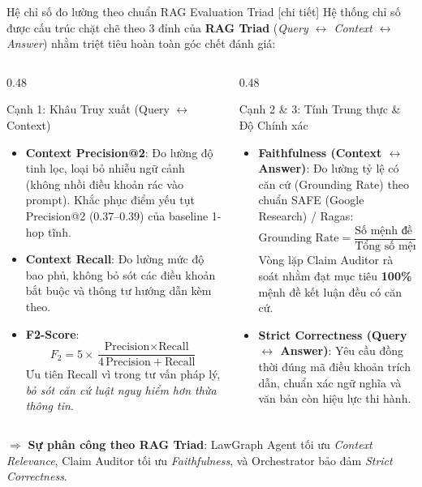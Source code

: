 \documentclass[aspectratio=169,10pt]{beamer}
\begin{document}
\begin{frame}{Hệ chỉ số đo lường theo chuẩn RAG Evaluation Triad [chi tiết]}
{\footnotesize Hệ thống chỉ số được cấu trúc chặt chẽ theo 3 đỉnh của \textbf{RAG Triad} (\textit{Query $\leftrightarrow$ Context $\leftrightarrow$ Answer}) nhằm triệt tiêu hoàn toàn góc chết đánh giá:}
\vskip0.15cm
\begin{columns}[T]
\begin{column}{0.48\textwidth}
\begin{block}{\small Cạnh 1: Khâu Truy xuất (Query $\leftrightarrow$ Context)}
\footnotesize
\begin{itemize}
  \item \textbf{Context Precision@2}: Đo lường độ tinh lọc, loại bỏ nhiễu ngữ cảnh (không nhồi điều khoản rác vào prompt). Khắc phục điểm yếu tụt Precision@2 (0.37--0.39) của baseline 1-hop tĩnh.
  \item \textbf{Context Recall}: Đo lường mức độ bao phủ, không bỏ sót các điều khoản bắt buộc và thông tư hướng dẫn kèm theo.
  \item \textbf{F2-Score}:
    $$F_2 = 5 \times \frac{\text{Precision} \times \text{Recall}}{4\,\text{Precision} + \text{Recall}}$$
    Ưu tiên Recall vì trong tư vấn pháp lý, \textit{bỏ sót căn cứ luật nguy hiểm hơn thừa thông tin}.
\end{itemize}
\end{block}
\end{column}

\begin{column}{0.48\textwidth}
\begin{block}{\small Cạnh 2 \& 3: Tính Trung thực \& Độ Chính xác}
\footnotesize
\begin{itemize}
  \item \textbf{Faithfulness (Context $\leftrightarrow$ Answer)}:
    Đo lường tỷ lệ có căn cứ (Grounding Rate) theo chuẩn SAFE (Google Research) / Ragas:
    $$\text{Grounding Rate} = \frac{\text{Số mệnh đề nguyên tử được chứng minh}}{\text{Tổng số mệnh đề pháp lý sinh ra}}$$
    Vòng lặp Claim Auditor rà soát nhằm đạt mục tiêu \textbf{100\%} mệnh đề kết luận đều có căn cứ.
  \item \textbf{Strict Correctness (Query $\leftrightarrow$ Answer)}:
    Yêu cầu đồng thời đúng mã điều khoản trích dẫn, chuẩn xác ngữ nghĩa và văn bản còn hiệu lực thi hành.
\end{itemize}
\end{block}
\end{column}
\end{columns}
\vskip0.12cm
{\tiny $\Rightarrow$ \textbf{Sự phân công theo RAG Triad}: LawGraph Agent tối ưu \textit{Context Relevance}, Claim Auditor tối ưu \textit{Faithfulness}, và Orchestrator bảo đảm \textit{Strict Correctness}.}
\end{frame}
\end{document}
